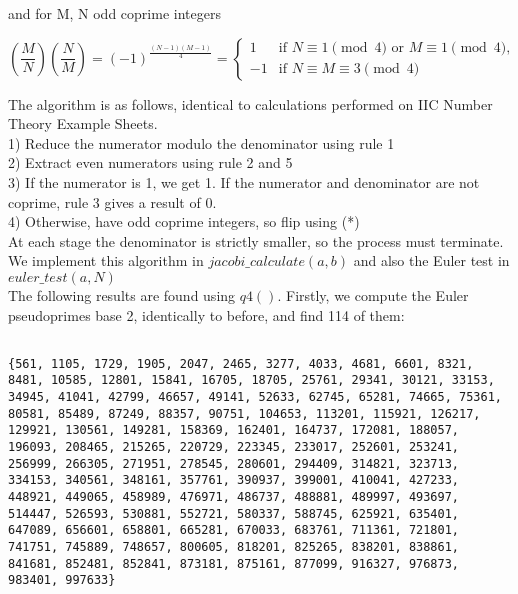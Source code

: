 \documentclass[10pt,a4paper]{report}
\newcommand{\legendre}[2]{(\frac{#1}{#2})}
\begin{document}
and for M, N odd coprime integers

\begin{equation*}
\legendre{M}{N}\legendre{N}{M} = (-1)^{\frac{(N-1)(M-1)}{4}} =
\begin{cases}
1 & \text{if } N \equiv 1 \pmod 4 \text{ or } M \equiv 1 \pmod 4,\\
-1 & \text{if } N\equiv M \equiv 3 \pmod 4
\end{cases}
\tag{*}
\end{equation*}

The algorithm is as follows, identical to calculations performed on IIC Number Theory Example Sheets.\\

1) Reduce the numerator modulo the denominator using rule 1 \\
2) Extract even numerators using rule 2 and 5\\
3) If the numerator is 1, we get 1. If the numerator and denominator are not coprime, rule 3 gives a result of 0.\\
4) Otherwise, have odd coprime integers, so flip using (*)\\


At each stage the denominator is strictly smaller, so the process must terminate. We implement this algorithm in $jacobi\_calculate(a,b)$ and also the Euler test in $euler\_test(a,N)$\\


The following results are found using $q4()$. Firstly, we compute the Euler pseudoprimes base 2, identically to before, and find 114 of them:

\begin{lstlisting}[breaklines]

{561, 1105, 1729, 1905, 2047, 2465, 3277, 4033, 4681, 6601, 8321, 8481, 10585, 12801, 15841, 16705, 18705, 25761, 29341, 30121, 33153, 34945, 41041, 42799, 46657, 49141, 52633, 62745, 65281, 74665, 75361, 80581, 85489, 87249, 88357, 90751, 104653, 113201, 115921, 126217, 129921, 130561, 149281, 158369, 162401, 164737, 172081, 188057, 196093, 208465, 215265, 220729, 223345, 233017, 252601, 253241, 256999, 266305, 271951, 278545, 280601, 294409, 314821, 323713, 334153, 340561, 348161, 357761, 390937, 399001, 410041, 427233, 448921, 449065, 458989, 476971, 486737, 488881, 489997, 493697, 514447, 526593, 530881, 552721, 580337, 588745, 625921, 635401, 647089, 656601, 658801, 665281, 670033, 683761, 711361, 721801, 741751, 745889, 748657, 800605, 818201, 825265, 838201, 838861, 841681, 852481, 852841, 873181, 875161, 877099, 916327, 976873, 983401, 997633}

\end{lstlisting}
\end{document}
